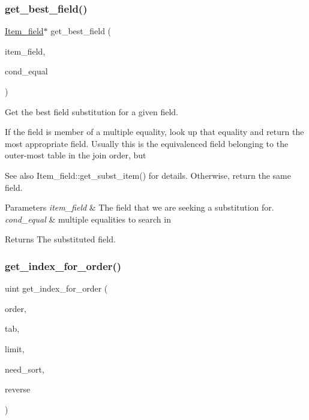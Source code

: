 \subsubsection{\texorpdfstring{get\+\_\+best\+\_\+field()}{get\_best\_field()}}
{\footnotesize\ttfamily \mbox{\hyperlink{classItem__field}{Item\+\_\+field}}$\ast$ get\+\_\+best\+\_\+field (\begin{DoxyParamCaption}\item[{\mbox{\hyperlink{classItem__field}{Item\+\_\+field}} $\ast$}]{item\+\_\+field,  }\item[{C\+O\+N\+D\+\_\+\+E\+Q\+U\+AL $\ast$}]{cond\+\_\+equal }\end{DoxyParamCaption})}

Get the best field substitution for a given field.

If the field is member of a multiple equality, look up that equality and return the most appropriate field. Usually this is the equivalenced field belonging to the outer-\/most table in the join order, but \begin{DoxySeeAlso}{See also}
Item\+\_\+field\+::get\+\_\+subst\+\_\+item() for details. Otherwise, return the same field.
\end{DoxySeeAlso}

\begin{DoxyParams}{Parameters}
{\em item\+\_\+field} & The field that we are seeking a substitution for. \\
\hline
{\em cond\+\_\+equal} & multiple equalities to search in\\
\hline
\end{DoxyParams}
\begin{DoxyReturn}{Returns}
The substituted field. 
\end{DoxyReturn}
\mbox{\label{group__Query__Optimizer_ga92d8a0c25d038fddac9b92696f6845e3}} 
\subsubsection{\texorpdfstring{get\+\_\+index\+\_\+for\+\_\+order()}{get\_index\_for\_order()}}
{\footnotesize\ttfamily uint get\+\_\+index\+\_\+for\+\_\+order (\begin{DoxyParamCaption}\item[{\mbox{\hyperlink{structst__order}{O\+R\+D\+ER}} $\ast$}]{order,  }\item[{\mbox{\hyperlink{classQEP__TAB}{Q\+E\+P\+\_\+\+T\+AB}} $\ast$}]{tab,  }\item[{ha\+\_\+rows}]{limit,  }\item[{bool $\ast$}]{need\+\_\+sort,  }\item[{bool $\ast$}]{reverse }\end{DoxyParamCaption})}

